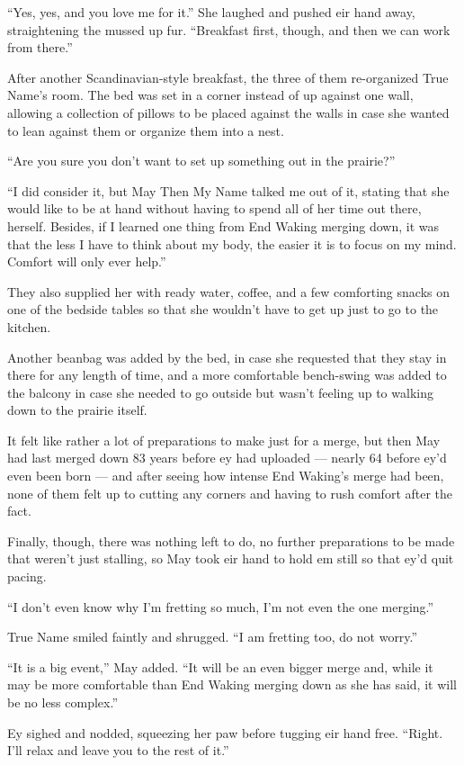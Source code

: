 ``Yes, yes, and you love me for it.'' She laughed and pushed eir hand away, straightening the mussed up fur. ``Breakfast first, though, and then we can work from there.''

After another Scandinavian-style breakfast, the three of them re-organized True Name's room. The bed was set in a corner instead of up against one wall, allowing a collection of pillows to be placed against the walls in case she wanted to lean against them or organize them into a nest.

``Are you sure you don't want to set up something out in the prairie?''

``I did consider it, but May Then My Name talked me out of it, stating that she would like to be at hand without having to spend all of her time out there, herself. Besides, if I learned one thing from End Waking merging down, it was that the less I have to think about my body, the easier it is to focus on my mind. Comfort will only ever help.''

They also supplied her with ready water, coffee, and a few comforting snacks on one of the bedside tables so that she wouldn't have to get up just to go to the kitchen.

Another beanbag was added by the bed, in case she requested that they stay in there for any length of time, and a more comfortable bench-swing was added to the balcony in case she needed to go outside but wasn't feeling up to walking down to the prairie itself.

It felt like rather a lot of preparations to make just for a merge, but then May had last merged down 83 years before ey had uploaded — nearly 64 before ey'd even been born — and after seeing how intense End Waking's merge had been, none of them felt up to cutting any corners and having to rush comfort after the fact.

Finally, though, there was nothing left to do, no further preparations to be made that weren't just stalling, so May took eir hand to hold em still so that ey'd quit pacing.

``I don't even know why I'm fretting so much, I'm not even the one merging.''

True Name smiled faintly and shrugged. ``I am fretting too, do not worry.''

``It is a big event,'' May added. ``It will be an even bigger merge and, while it may be more comfortable than End Waking merging down as she has said, it will be no less complex.''

Ey sighed and nodded, squeezing her paw before tugging eir hand free. ``Right. I'll relax and leave you to the rest of it.''

